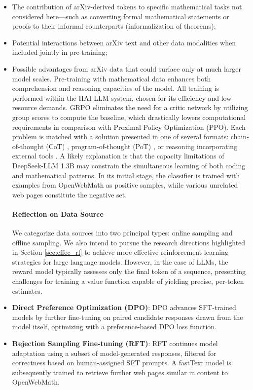 \begin{itemize}[topsep=0pt]
    \item The contribution of arXiv-derived tokens to specific mathematical tasks not considered here—such as converting formal mathematical statements or proofs to their informal counterparts (informalization of theorems);
    \item Potential interactions between arXiv text and other data modalities when included jointly in pre-training;
    \item Possible advantages from arXiv data that could surface only at much larger model scales. Pre-training with mathematical data enhances both comprehension and reasoning capacities of the model. All training is performed within the HAI-LLM \citep{haillm} system, chosen for its efficiency and low resource demands. GRPO eliminates the need for a critic network by utilizing group scores to compute the baseline, which drastically lowers computational requirements in comparison with Proximal Policy Optimization (PPO). Each problem is matched with a solution presented in one of several formats: chain-of-thought (CoT) \citep{cot}, program-of-thought (PoT) \citep{pot,pal}, or reasoning incorporating external tools \citep{tora}. A likely explanation is that the capacity limitations of DeepSeek-LLM 1.3B may constrain the simultaneous learning of both coding and mathematical patterns. In its initial stage, the classifier is trained with examples from OpenWebMath \citep{openwebmath} as positive samples, while various unrelated web pages constitute the negative set. \paragraph{Reflection on Data Source} We categorize data sources into two principal types: online sampling and offline sampling. We also intend to pursue the research directions highlighted in Section \ref{sec:effec_rl} to achieve more effective reinforcement learning strategies for large language models. However, in the case of LLMs, the reward model typically assesses only the final token of a sequence, presenting challenges for training a value function capable of yielding precise, per-token estimates. \item \textbf{Direct Preference Optimization (DPO)}: DPO advances SFT-trained models by further fine-tuning on paired candidate responses drawn from the model itself, optimizing with a preference-based DPO loss function. \item \textbf{Rejection Sampling Fine-tuning (RFT)}: RFT continues model adaptation using a subset of model-generated responses, filtered for correctness based on human-assigned SFT prompts. A fastText model \citep{joulin2016fasttext} is subsequently trained to retrieve further web pages similar in content to OpenWebMath. \end{itemize}

